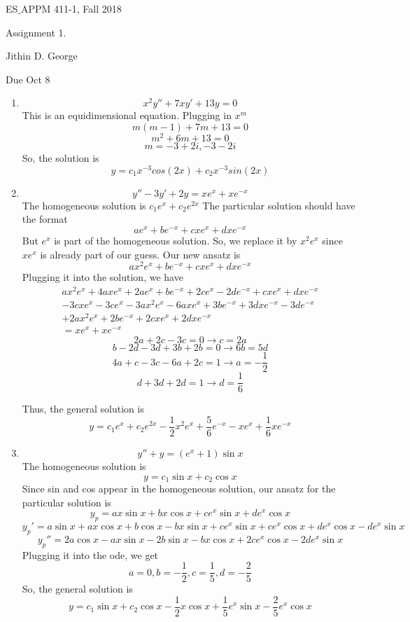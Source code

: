 \documentclass[letterpaper,12pt]{article}
\begin{document}




\noindent
{\scriptsize ES$\_$APPM 411-1, Fall 2018} \hfill

\begin{center}
\large
Assignment 1.
\normalsize

Jithin D. George
\end{center}

\noindent
Due Oct 8
\vspace{.3in}




\noindent


\begin{enumerate}
\item
\[x^2y'' + 7xy' +13y =0\]
This is an equidimensional equation. Plugging in $x^m$
\[m(m-1)+7m+13=0\]
\[m^2+6m+13=0\]
\[m = -3 +2i,-3 -2i\]
So, the solution is
\[y = c_1 x^{-3}cos(2x)+ c_2 x^{-3}sin(2x)\]

\item
\[y''-3y'+2y=xe^x+xe^{-x}\]
The homogeneous solution is $c_1 e^x +c_2 e^{2x}$
The particular solution should  have the format
\[ae^x+be^{-x}+ c xe^x+d xe^{-x}\]
But $e^x$ is part of the homogeneous solution. So, we replace it by $x^2e^x$ since $xe^x$ is already part of our guess. Our new ansatz is
\[ax^2e^x+be^{-x}+ c xe^x+d xe^{-x}\]
Plugging it into the solution, we have
\begin{align*}
ax^2e^x+ 4axe^x+2ae^x+be^{-x}+2ce^x-2de^{-x}+ c xe^x+d xe^{-x}\\
-3cxe^x-3ce^x-3ax^2e^x-6axe^x+3be^{-x}+3dxe^{-x}-3de^{-x}\\
+2ax^2e^x+2be^{-x}+2c xe^x+2d xe^{-x}
\\ = xe^x+xe^{-x}
\end{align*}
\[2a+2c-3c=0\to c=2a\]
\[b-2d-3d+3b+2b=0 \to 6b =5d\]
\[4a+c-3c-6a+2c=1\to a = -\frac{1}{2}\]
\[d+3d+2d=1 \to d = \frac{1}{6}\]

Thus, the general solution is
\[y = c_1 e^x +c_2 e^{2x} -\frac{1}{2}x^2e^x+\frac{5}{6}e^{-x}- xe^x+\frac{1}{6} xe^{-x}\]

\item

\[y'' +y = (e^x+1)\sin x\]
The homogeneous solution is
\[y = c_1 \sin x + c_2 \cos x\]
Since sin and cos appear in the homogeneous solution, our ansatz for the particular solution is
\[y_p = a x \sin x + b x \cos x + c e^x \sin x + d e^x \cos x \]
\[y_p' = a  \sin x + a x \cos x + b \cos x - b x \sin x + c e^x \sin x+ c e^x \cos x + d e^x \cos x-  d e^x \sin x \]
\[y_p'' = 2a  \cos x - a x \sin x -2 b \sin x - b x \cos x +  2c e^x \cos x - 2 d e^x \sin x \]
Plugging it into the ode, we get
\[a =0, b = -\frac{1}{2}, c= \frac{1}{5}, d=-\frac{2}{5}\]
So, the general solution is
\[y = c_1 \sin x + c_2 \cos x -\frac{1}{2} x \cos x + \frac{1}{5} e^x \sin x -\frac{2}{5} e^x \cos x \]


\end{enumerate}
\end{document}
